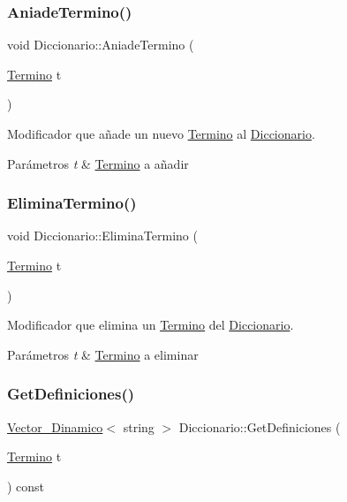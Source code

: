 \subsubsection{\texorpdfstring{AniadeTermino()}{AniadeTermino()}}
{\footnotesize\ttfamily void Diccionario\+::\+Aniade\+Termino (\begin{DoxyParamCaption}\item[{\mbox{\hyperlink{classTermino}{Termino}}}]{t }\end{DoxyParamCaption})}



Modificador que añade un nuevo \mbox{\hyperlink{classTermino}{Termino}} al \mbox{\hyperlink{classDiccionario}{Diccionario}}. 


\begin{DoxyParams}{Parámetros}
{\em t} & \mbox{\hyperlink{classTermino}{Termino}} a añadir \\
\hline
\end{DoxyParams}
\mbox{\label{classDiccionario_a30f3ba501df6db597f87ca6bd37f069e}} 
\subsubsection{\texorpdfstring{EliminaTermino()}{EliminaTermino()}}
{\footnotesize\ttfamily void Diccionario\+::\+Elimina\+Termino (\begin{DoxyParamCaption}\item[{\mbox{\hyperlink{classTermino}{Termino}}}]{t }\end{DoxyParamCaption})}



Modificador que elimina un \mbox{\hyperlink{classTermino}{Termino}} del \mbox{\hyperlink{classDiccionario}{Diccionario}}. 


\begin{DoxyParams}{Parámetros}
{\em t} & \mbox{\hyperlink{classTermino}{Termino}} a eliminar \\
\hline
\end{DoxyParams}
\mbox{\label{classDiccionario_a005029e0a1e8b28dcb504e524d25d57e}} 
\subsubsection{\texorpdfstring{GetDefiniciones()}{GetDefiniciones()}}
{\footnotesize\ttfamily \mbox{\hyperlink{classVector__Dinamico}{Vector\+\_\+\+Dinamico}}$<$ string $>$ Diccionario\+::\+Get\+Definiciones (\begin{DoxyParamCaption}\item[{\mbox{\hyperlink{classTermino}{Termino}}}]{t }\end{DoxyParamCaption}) const}



